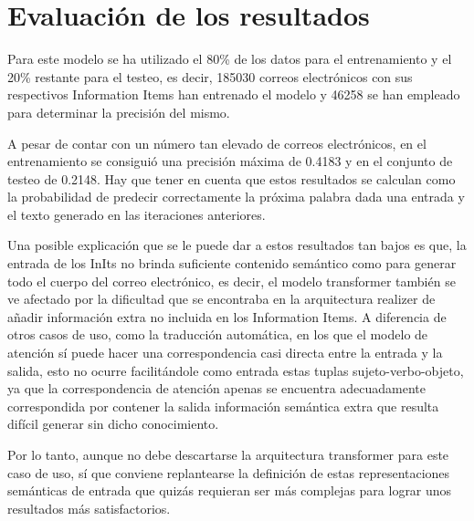 \section{Evaluación de los resultados}\label{s:resultados}

Para este modelo se ha utilizado el 80\% de los datos para el entrenamiento y el 20\% restante para el testeo, es decir, 185030 correos electrónicos con sus respectivos Information Items han entrenado el modelo y 46258 se han empleado para determinar la precisión del mismo.

A pesar de contar con un número tan elevado de correos electrónicos, en el entrenamiento se consiguió una precisión máxima de 0.4183 y en el conjunto de testeo de 0.2148. Hay que tener en cuenta que estos resultados se calculan como la probabilidad de predecir correctamente la próxima palabra dada una entrada y el texto generado en las iteraciones anteriores.

Una posible explicación que se le puede dar a estos resultados tan bajos es que, la entrada de los InIts no brinda suficiente contenido semántico como para generar todo el cuerpo del correo electrónico, es decir, el modelo transformer también se ve afectado por la dificultad que se encontraba en la arquitectura realizer de añadir información extra no incluida en los Information Items. A diferencia de otros casos de uso, como la traducción automática, en los que el modelo de atención sí puede hacer una correspondencia casi directa entre la entrada y la salida, esto no ocurre facilitándole como entrada estas tuplas sujeto-verbo-objeto, ya que la correspondencia de atención apenas se encuentra adecuadamente correspondida por contener la salida información semántica extra que resulta difícil generar sin dicho conocimiento.

Por lo tanto, aunque no debe descartarse la arquitectura transformer para este caso de uso, sí que conviene replantearse la definición de estas representaciones semánticas de entrada que quizás requieran ser más complejas para lograr unos resultados más satisfactorios.
